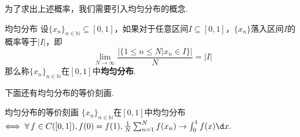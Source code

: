 为了求出上述概率，我们需要引入均匀分布的概念.\par

\begin{definition}{均匀分布}
    设$\{x_n\}_{n\in\mathbb{N}} \subseteq [0,1]$，如果对于任意区间$I \subseteq [0,1]$，$\{x_n\}$落入区间$I$的概率等于$|I|$，即
    \[\lim_{N\to\infty}{\frac{\Big|\big\{1\leqslant n \leqslant N|x_n \in I\big\}\Big|}{N}} = |I|\]
    那么称$\{x_n\}_{n\in\mathbb{N}}$在$[0,1]$中\textbf{均匀分布}.
\end{definition}

下面还有均匀分布的等价刻画.
\begin{proposition}{均匀分布的等价刻画}
    $\{x_n\}_{n\in\mathbb{N}}$在$[0,1]$中均匀分布$\Longleftrightarrow\; \forall\, f\in C([0,1]), f(0)=f(1), \frac{1}{N}\sum_{n=1}^N{f(x_n)}\to \int_{0}^{1}{f(x)}\d x.$
\end{proposition}
